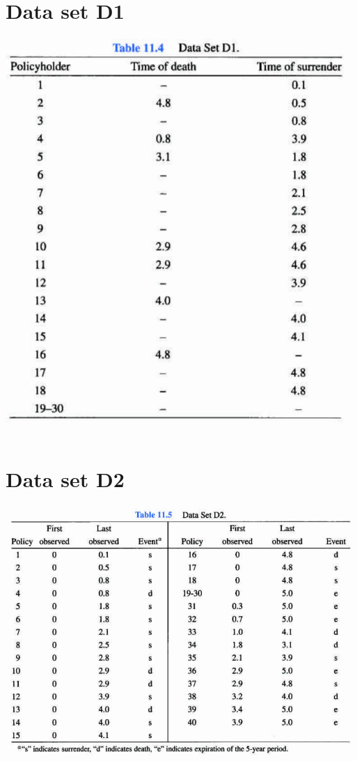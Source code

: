 \documentclass[12pt, french]{report}
\begin{document}
\section{Data set D1}
\begin{center}
\includegraphics[scale=0.5]{src/Data-Set-D1.png}
\end{center}


\section{Data set D2}
\begin{center}
\includegraphics[scale=0.5]{src/Data-Set-D2.png}
\end{center}
\end{document}
